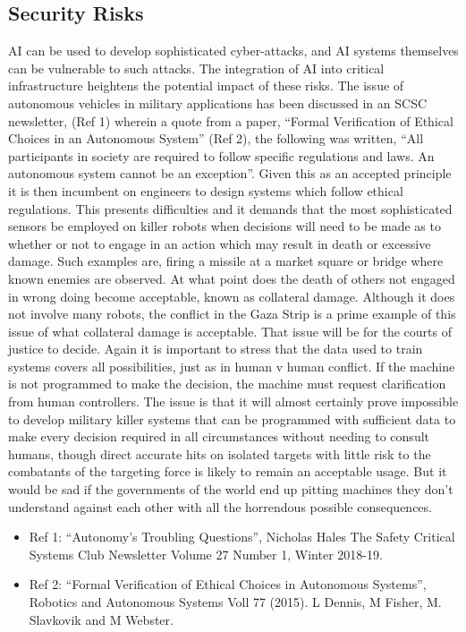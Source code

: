 \subsection{Security Risks}
AI can be used to develop sophisticated cyber-attacks, and AI systems themselves can be vulnerable to such attacks. The integration of AI into critical infrastructure heightens the potential impact of these risks. The issue of autonomous vehicles in military applications has been discussed in an SCSC newsletter, (Ref 1) wherein a quote from a paper, “Formal Verification of Ethical Choices in an Autonomous System” (Ref 2), the following was written, “All participants in society are required to follow specific regulations and laws. An autonomous system cannot be an exception”. Given this as an accepted  principle it is then incumbent on engineers to design systems which follow ethical regulations. This presents difficulties and it demands that the most sophisticated sensors be employed on killer robots when decisions will need to be made as to whether or not to engage in an action which may result in death or excessive damage. Such examples are, firing a missile at a market square or bridge where known enemies are observed. At what point does the death of others not engaged in wrong doing become acceptable, known as collateral damage. Although it does not involve many robots, the conflict in the Gaza Strip is a prime example of this issue of what collateral damage is acceptable. That issue will be for the courts of justice to decide. Again it is important to stress that  the data used to train systems covers all possibilities, just as in human v  human conflict. If the machine is not programmed to make the decision, the machine must request clarification from human controllers. The issue is that it will almost certainly prove impossible to develop military killer systems that can be programmed with sufficient data to make every decision required in all circumstances without needing to consult humans, though direct accurate hits on isolated targets with little risk to the combatants of the targeting force is likely to remain an acceptable usage. But it would be sad if the governments of the world end up pitting machines they don’t understand against each other with all the horrendous possible consequences.
\begin{itemize}
\item Ref 1: “Autonomy’s Troubling Questions”, Nicholas Hales The Safety Critical Systems Club Newsletter Volume 27 Number 1, Winter 2018-19.
\item Ref 2: “Formal Verification of Ethical Choices in Autonomous Systems”, Robotics and Autonomous Systems Voll 77 (2015). L Dennis, M Fisher, M. Slavkovik and M Webster.
\end{itemize}

